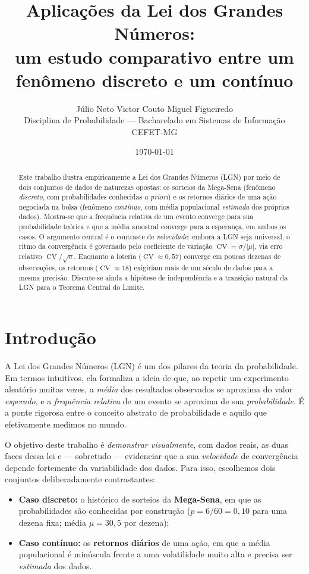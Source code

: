\documentclass[12pt,a4paper]{article}
\title{\textbf{Aplicações da Lei dos Grandes Números:\\
um estudo comparativo entre um fenômeno discreto e um contínuo}}
\author{%
  Júlio Neto \quad Victor Couto \quad Miguel Figueiredo \\
  \small Disciplina de Probabilidade --- Bacharelado em Sistemas de Informação \\
  \small CEFET-MG
}
\date{\today}
\newcommand{\CV}{\operatorname{CV}}
\begin{document}
\maketitle

\begin{abstract}
\noindent
Este trabalho ilustra empiricamente a Lei dos Grandes Números (LGN) por meio de dois
conjuntos de dados de naturezas opostas: os sorteios da Mega-Sena (fenômeno
\emph{discreto}, com probabilidades conhecidas \emph{a priori}) e os retornos diários
de uma ação negociada na bolsa (fenômeno \emph{contínuo}, com média populacional
\emph{estimada} dos próprios dados). Mostra-se que a frequência relativa de um evento
converge para sua probabilidade teórica e que a média amostral converge para a
esperança, em ambos os casos. O argumento central é o contraste de \emph{velocidade}:
embora a LGN seja universal, o ritmo da convergência é governado pelo coeficiente de
variação $\CV=\sigma/|\mu|$, via erro relativo $\CV/\sqrt{n}$. Enquanto a loteria
($\CV\approx 0{,}57$) converge em poucas dezenas de observações, os retornos
($\CV\approx 18$) exigiriam mais de um século de dados para a mesma precisão.
Discute-se ainda a hipótese de independência e a transição natural da LGN para o
Teorema Central do Limite.
\end{abstract}

\section{Introdução}

A Lei dos Grandes Números (LGN) é um dos pilares da teoria da probabilidade. Em termos
intuitivos, ela formaliza a ideia de que, ao repetir um experimento aleatório muitas
vezes, a \emph{média} dos resultados observados se aproxima do valor \emph{esperado}, e
a \emph{frequência relativa} de um evento se aproxima de sua \emph{probabilidade}. É a
ponte rigorosa entre o conceito abstrato de probabilidade e aquilo que efetivamente
medimos no mundo.

O objetivo deste trabalho é \emph{demonstrar visualmente}, com dados reais, as duas
faces dessa lei e --- sobretudo --- evidenciar que a sua \emph{velocidade} de
convergência depende fortemente da variabilidade dos dados. Para isso, escolhemos dois
conjuntos deliberadamente contrastantes:

\begin{itemize}
  \item \textbf{Caso discreto:} o histórico de sorteios da \textbf{Mega-Sena}, em que
        as probabilidades são conhecidas por construção ($p = 6/60 = 0{,}10$ para uma
        dezena fixa; média $\mu = 30{,}5$ por dezena);
  \item \textbf{Caso contínuo:} os \textbf{retornos diários} de uma ação, em que a
        média populacional é minúscula frente a uma volatilidade muito alta e precisa
        ser \emph{estimada} dos dados.
\end{itemize}
\end{document}
